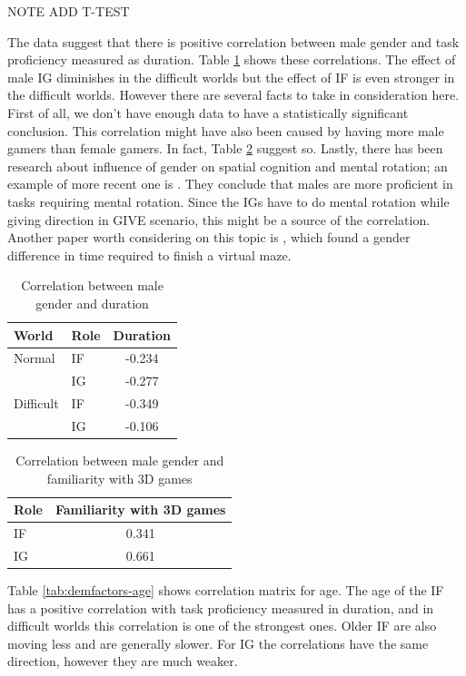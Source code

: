 NOTE ADD T-TEST

The data suggest that there is positive correlation between male gender and task proficiency measured as duration. Table \ref{tab:demfactors-gender} shows these correlations. The effect of male IG diminishes in the difficult worlds but the effect of IF is even stronger in the difficult worlds. However there are several facts to take in consideration here. First of all, we don't have enough data to have a statistically significant conclusion. This correlation might have also been caused by having more male gamers than female gamers. In fact, Table \ref{tab:demfactors-gender-fam} suggest so. Lastly, there has been research about influence of gender on spatial cognition and mental rotation; an example of more recent one is \citep{geary2000sex}. They conclude that males are more proficient in tasks requiring mental rotation. Since the IGs have to do mental rotation while giving direction in GIVE scenario, this might be a source of the correlation. Another paper worth considering on this topic is \citep{moffat1998navigation}, which found a gender difference in time required to finish a virtual maze.

\begin{table}[!htbp]
 \centering
\begin{tabular}{llc}
\toprule
 World & Role   & Duration \\
\midrule
Normal & IF &	-0.234\\
 & IG &	-0.277\\
\midrule
Difficult & IF & -0.349\\
 & IG &	-0.106\\
\bottomrule
\end{tabular}
\caption{Correlation between male gender and duration}
\label{tab:demfactors-gender}
\end{table}

\begin{table}[!htbp]
 \centering
\begin{tabular}{lc}
\toprule
Role    & Familiarity with 3D games \\
\midrule
 IF &	 0.341\\
 IG &	0.661\\
\bottomrule
\end{tabular}
\caption{Correlation between male gender and familiarity with 3D games}
\label{tab:demfactors-gender-fam}
\end{table}

Table \ref{tab:demfactors-age} shows correlation matrix for age. The age of the IF has a positive correlation with task proficiency measured in duration, and in difficult worlds this correlation is one of the strongest ones. Older IF are also moving less and are generally slower. For IG the correlations have the same direction, however they are much weaker.

